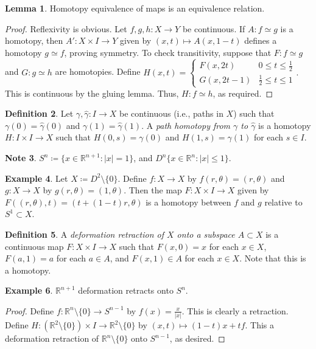 \documentclass[10pt,letterpaper,cm]{nupset}
\theoremstyle{definition}
\newtheorem{definition}{Definition}[subsection]
\newtheorem{exmp}[definition]{Example}
\newtheorem{note}[definition]{Note}
\theoremstyle{theorem}
\newtheorem{lemma}[definition]{Lemma}
\theoremstyle{remark}
\newcommand{\R}{\mathbb R}
\newcommand{\1}{\mathbf{1}}
\newcommand{\0}{\vec 0}
\begin{document}
\begin{lemma}
Homotopy equivalence of maps is an equivalence relation.
\end{lemma}
\begin{proof}
Reflexivity is obvious.  Let $f, g, h : X \to Y$ be continuous. If $A: f \simeq g$ is a homotopy, then $A' : X \times I \to Y$ given by $(x,t) \mapsto A(x, 1-t)$ defines a homotopy $g\simeq f$, proving symmetry. To check transitivity, suppose that $F : f \simeq g$ and $G: g\simeq h$ are homotopies. Define $H(x,t) = \begin{cases}
F(x, 2t) & 0 \leq t \leq \frac{1}{2}
\\ G(x, 2t-1) & \frac{1}{2} \leq t \leq 1
\end{cases}.$ This is continuous by the gluing lemma. Thus, $H : f \simeq h$, as required. 
\end{proof}

\begin{definition}
Let $\gamma, \hat{\gamma}: I \to X$ be continuous (i.e., paths in $X$) such that $\gamma(0) = \hat{\gamma}(0)$ and $\gamma(1) = \hat{\gamma}(1)$.  A \textit{path homotopy from $\gamma$ to $\hat{\gamma}$} is a homotopy $H: I \times I \to X$ such that $H(0,s) = \gamma(0)$ and $H(1,s) = \gamma(1)$ for each $s\in I$.
\end{definition}

\begin{note}
$S^n \coloneqq \{x\in \R^{n+1} : |x| =1\}$, and $D^n \{x\in \R^n : |x|\leq 1\}$.
\end{note}

\begin{exmp}
Let $X\coloneqq D^2 \setminus \{0\}$. Define $f: X \to X$ by $f(r, \theta) = (r, \theta)$ and $g: X \to X$ by $g(r, \theta) = (1, \theta)$. Then the map $F: X \times I \to X$ given by  $F((r, \theta), t)=  (t+ (1-t)r, \theta)$ is a homotopy between $f$ and $g$ relative to $S^1\subset X$.
\end{exmp}

\begin{definition}
A \textit{deformation retraction of $X$ onto a subspace $A\subset X$} is a continuous map $F: X \times I \to X$ such that $F(x, 0) = x$ for each $x\in X$, $F(a, 1) = a$ for each $a\in A$, and $F(x, 1) \in A$ for each $x\in X$. Note that this is a homotopy. 
\end{definition}

\begin{exmp}  $\R^{n+1}$ deformation retracts onto $S^n$. 
\end{exmp}
\begin{proof}
Define $f: \R^n \setminus \{0\} \to S^{n-1}$ by $f(x) = \frac{x}{|x|}$. This is clearly a retraction. Define $H : (\R^2 \setminus \{0\}) \times I \to \R^2 \setminus \{0\}$ by $(x, t) \mapsto (1-t)x +tf$. This a deformation retraction of $ \R^n \setminus \{0\}$ onto $S^{n-1}$, as desired. 
\end{proof}
\end{document}
